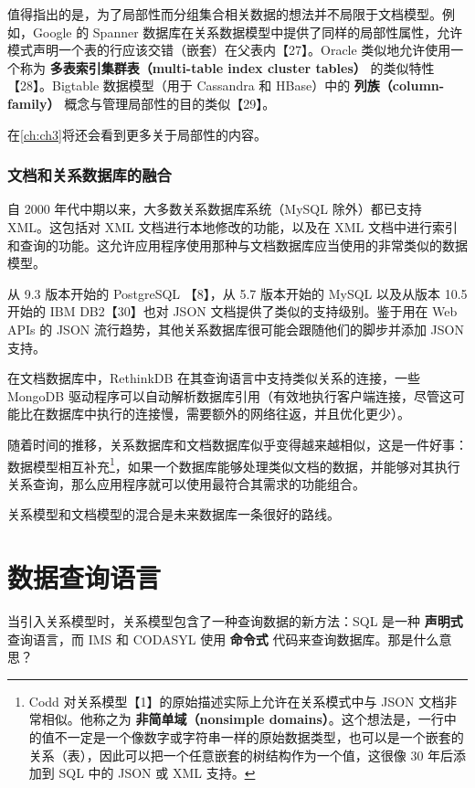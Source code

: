 值得指出的是，为了局部性而分组集合相关数据的想法并不局限于文档模型。例如，Google 的 Spanner 数据库在关系数据模型中提供了同样的局部性属性，允许模式声明一个表的行应该交错（嵌套）在父表内【27】。Oracle 类似地允许使用一个称为 \textbf{多表索引集群表（multi-table index cluster tables）} 的类似特性【28】。Bigtable 数据模型（用于 Cassandra 和 HBase）中的 \textbf{列族（column-family）} 概念与管理局部性的目的类似【29】。

在\autoref{ch:ch3}将还会看到更多关于局部性的内容。

\subsubsection{文档和关系数据库的融合}

自 2000 年代中期以来，大多数关系数据库系统（MySQL 除外）都已支持 XML。这包括对 XML 文档进行本地修改的功能，以及在 XML 文档中进行索引和查询的功能。这允许应用程序使用那种与文档数据库应当使用的非常类似的数据模型。

从 9.3 版本开始的 PostgreSQL 【8】，从 5.7 版本开始的 MySQL 以及从版本 10.5 开始的 IBM DB2【30】也对 JSON 文档提供了类似的支持级别。鉴于用在 Web APIs 的 JSON 流行趋势，其他关系数据库很可能会跟随他们的脚步并添加 JSON 支持。

在文档数据库中，RethinkDB 在其查询语言中支持类似关系的连接，一些 MongoDB 驱动程序可以自动解析数据库引用（有效地执行客户端连接，尽管这可能比在数据库中执行的连接慢，需要额外的网络往返，并且优化更少）。

随着时间的推移，关系数据库和文档数据库似乎变得越来越相似，这是一件好事：数据模型相互补充\footnote{Codd 对关系模型【1】的原始描述实际上允许在关系模式中与 JSON 文档非常相似。他称之为 \textbf{非简单域（nonsimple domains）}。这个想法是，一行中的值不一定是一个像数字或字符串一样的原始数据类型，也可以是一个嵌套的关系（表），因此可以把一个任意嵌套的树结构作为一个值，这很像 30 年后添加到 SQL 中的 JSON 或 XML 支持。}，如果一个数据库能够处理类似文档的数据，并能够对其执行关系查询，那么应用程序就可以使用最符合其需求的功能组合。

关系模型和文档模型的混合是未来数据库一条很好的路线。

\section{数据查询语言}

当引入关系模型时，关系模型包含了一种查询数据的新方法：SQL 是一种 \textbf{声明式} 查询语言，而 IMS 和 CODASYL 使用 \textbf{命令式} 代码来查询数据库。那是什么意思？

